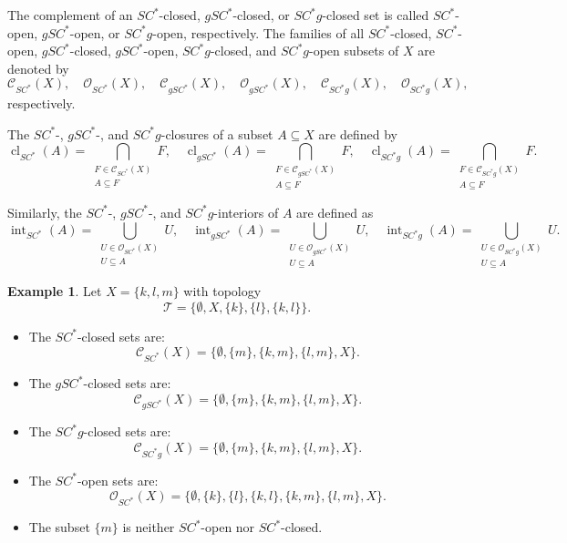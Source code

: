 \documentclass[12pt,a4paper,twoside]{report}  %
\theoremstyle{plain}
\theoremstyle{definition}
\newtheorem{example}[theorem]{Example}
\begin{document}
The complement of an $SC^*$-closed, $gSC^*$-closed, or $SC^*g$-closed set is called $SC^*$-open, $gSC^*$-open, or $SC^*g$-open, respectively. 
The families of all $SC^*$-closed, $SC^*$-open, $gSC^*$-closed, $gSC^*$-open, $SC^*g$-closed, and $SC^*g$-open subsets of $X$ are denoted by
\[
\mathcal{C}_{SC^*}(X), \quad \mathcal{O}_{SC^*}(X), \quad 
\mathcal{C}_{gSC^*}(X), \quad \mathcal{O}_{gSC^*}(X), \quad
\mathcal{C}_{SC^*g}(X), \quad \mathcal{O}_{SC^*g}(X),
\]
respectively.

The $SC^*$-, $gSC^*$-, and $SC^*g$-closures of a subset $A \subseteq X$ are defined by
\[
\operatorname{cl}_{SC^*}(A) = \bigcap_{\substack{F \in \mathcal{C}_{SC^*}(X) \\ A \subseteq F}} F, \quad
\operatorname{cl}_{gSC^*}(A) = \bigcap_{\substack{F \in \mathcal{C}_{gSC^*}(X) \\ A \subseteq F}} F, \quad
\operatorname{cl}_{SC^*g}(A) = \bigcap_{\substack{F \in \mathcal{C}_{SC^*g}(X) \\ A \subseteq F}} F.
\]

Similarly, the $SC^*$-, $gSC^*$-, and $SC^*g$-interiors of $A$ are defined as
\[
\operatorname{int}_{SC^*}(A) = \bigcup_{\substack{U \in \mathcal{O}_{SC^*}(X) \\ U \subseteq A}} U, \quad
\operatorname{int}_{gSC^*}(A) = \bigcup_{\substack{U \in \mathcal{O}_{gSC^*}(X) \\ U \subseteq A}} U, \quad
\operatorname{int}_{SC^*g}(A) = \bigcup_{\substack{U \in \mathcal{O}_{SC^*g}(X) \\ U \subseteq A}} U.
\]

\noindent

\begin{example}
Let $X = \{k, l, m\}$ with topology
\[
\mathcal{T} = \{\emptyset, X, \{k\}, \{l\}, \{k,l\}\}.
\]

\begin{itemize}
\item The $SC^*$-closed sets are:
\[
\mathcal{C}_{SC^*}(X) = \{\emptyset, \{m\}, \{k,m\}, \{l,m\}, X\}.
\]

\item The $gSC^*$-closed sets are:
\[
\mathcal{C}_{gSC^*}(X) = \{\emptyset, \{m\}, \{k,m\}, \{l,m\}, X\}.
\]

\item The $SC^*g$-closed sets are:
\[
\mathcal{C}_{SC^*g}(X) = \{\emptyset, \{m\}, \{k,m\}, \{l,m\}, X\}.
\]

\item The $SC^*$-open sets are:
\[
\mathcal{O}_{SC^*}(X) = \{\emptyset, \{k\}, \{l\}, \{k,l\}, \{k,m\}, \{l,m\}, X\}.
\]

\item The subset $\{m\}$ is neither $SC^*$-open nor $SC^*$-closed.
\end{itemize}
\end{example}
\end{document}
